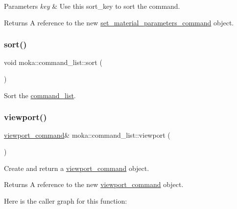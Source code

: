 \begin{DoxyParams}{Parameters}
{\em key} & Use this sort\+\_\+key to sort the command. \\
\hline
\end{DoxyParams}
\begin{DoxyReturn}{Returns}
A reference to the new \mbox{\hyperlink{classmoka_1_1set__material__parameters__command}{set\+\_\+material\+\_\+parameters\+\_\+command}} object. 
\end{DoxyReturn}
\mbox{\label{classmoka_1_1command__list_a7c4e7f6a3e3dc4debb6e81cddd34ac69}} 
\subsubsection{\texorpdfstring{sort()}{sort()}}
{\footnotesize\ttfamily void moka\+::command\+\_\+list\+::sort (\begin{DoxyParamCaption}{ }\end{DoxyParamCaption})}



Sort the \mbox{\hyperlink{classmoka_1_1command__list}{command\+\_\+list}}. 

\mbox{\label{classmoka_1_1command__list_a93d0d14be17e169aeb72ba2eeb3512ba}} 
\subsubsection{\texorpdfstring{viewport()}{viewport()}\hspace{0.1cm}{\footnotesize\ttfamily [1/2]}}
{\footnotesize\ttfamily \mbox{\hyperlink{classmoka_1_1viewport__command}{viewport\+\_\+command}}\& moka\+::command\+\_\+list\+::viewport (\begin{DoxyParamCaption}{ }\end{DoxyParamCaption})}



Create and return a \mbox{\hyperlink{classmoka_1_1viewport__command}{viewport\+\_\+command}} object. 

\begin{DoxyReturn}{Returns}
A reference to the new \mbox{\hyperlink{classmoka_1_1viewport__command}{viewport\+\_\+command}} object. 
\end{DoxyReturn}
Here is the caller graph for this function\+:
\mbox{\label{classmoka_1_1command__list_aa3f9a1b7e3cede9efc46ccb300fee586}} 

